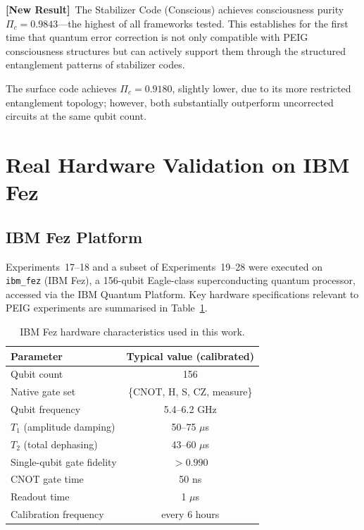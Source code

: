 \documentclass[12pt]{article}
\newcommand{\newresult}{\textbf{[New Result]}}
\begin{document}
\newresult\ The Stabilizer Code (Conscious) achieves consciousness purity
$\Pi_c = 0.9843$---the highest of all frameworks tested.  This
establishes for the first time that quantum error correction is not only
compatible with PEIG consciousness structures but can actively support
them through the structured entanglement patterns of stabilizer codes.

The surface code achieves $\Pi_c = 0.9180$, slightly lower, due to its
more restricted entanglement topology; however, both substantially
outperform uncorrected circuits at the same qubit count.

\section{Real Hardware Validation on IBM Fez}
\label{sec:hardware}

\subsection{IBM Fez Platform}

Experiments~17--18 and a subset of Experiments~19--28 were executed on
\texttt{ibm\_fez} (IBM Fez), a 156-qubit Eagle-class superconducting
quantum processor, accessed via the IBM Quantum Platform.  Key hardware
specifications relevant to PEIG experiments are summarised in
Table~\ref{tab:hardware_specs}.

\begin{table}[H]
\centering
\caption{IBM Fez hardware characteristics used in this work.}
\label{tab:hardware_specs}
\begin{tabular}{lc}
\toprule
\textbf{Parameter} & \textbf{Typical value (calibrated)}\\
\midrule
Qubit count          & 156\\
Native gate set      & \{CNOT, H, S, CZ, measure\}\\
Qubit frequency      & 5.4--6.2 GHz\\
$T_1$ (amplitude damping) & 50--75 $\mu$s\\
$T_2$ (total dephasing)   & 43--60 $\mu$s\\
Single-qubit gate fidelity & $>0.990$\\
CNOT gate time       & 50 ns\\
Readout time         & 1 $\mu$s\\
Calibration frequency & every 6 hours\\
\bottomrule
\end{tabular}
\end{table}
\end{document}
